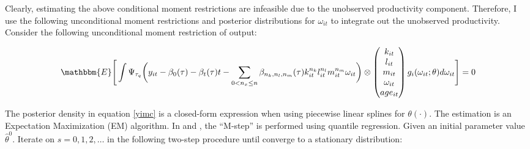 \documentclass{article}
\begin{document}
Clearly, estimating the above conditional moment restrictions are infeasible due to the unobserved productivity component. Therefore, I use the following unconditional moment restrictions and posterior distributions for $\omega_{it}$ to integrate out the unobserved productivity. Consider the following unconditional moment restriction of output:

\begin{equation}\label{yimc}
\mathbbm{E}\Bigg[\int\Psi_{\tau_{q}}\bigg(y_{it}-\beta_{0}(\tau)-\beta_{t}(\tau)t-\sum_{0<n_{x}\leq n}\beta_{n_{k}, n_{l}, n_{m}}(\tau)k_{it}^{n_{k}}l^{n_{l}}_{it}m^{n_{m}}_{it}\omega_{it}\bigg)\otimes
\begin{pmatrix}
k_{it} \\
l_{it}\\
m_{it} \\
\omega_{it} \\
age_{it}
\end{pmatrix}
g_{i}(\omega_{it};\theta)d\omega_{it}\Bigg]=0
\end{equation}

The posterior density in equation \eqref{yimc} is a closed-form expression when using piecewise linear splines for $\theta(\cdot)$. The estimation is an Expectation Maximization (EM) algorithm. In \cite{Arellano2016} and \cite{Arellano2017}, the ``M-step'' is performed using quantile regression. Given an initial parameter value $\hat{\theta}^{0}$. Iterate on $s=0,1,2,\dots$ in the following two-step procedure until converge to a stationary distribution:
\end{document}
